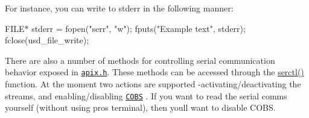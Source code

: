 For instance, you can write to {\ttfamily stderr} in the following manner\+:


\begin{DoxyCode}
FILE* stderr = fopen("serr", "w");
fputs("Example text", stderr);
fclose(usd\_file\_write);
\end{DoxyCode}


There are also a number of methods for controlling serial communication behavior exposed in \href{../../extended/apix.html}{\tt apix.\+h}. These methods can be accessed through the {\ttfamily \hyperlink{apix_8h_a962daefd6f45a8def6ff00802a23fbff}{serctl()}} function. At the moment two actions are supported -\/activating/deactivating the streams, and enabling/disabling \href{https://en.wikipedia.org/wiki/Consistent_Overhead_Byte_Stuffing}{\tt C\+O\+BS} . If you want to read the serial comms yourself (without using {\ttfamily pros terminal}), then you\textquotesingle{}ll want to disable C\+O\+BS. 